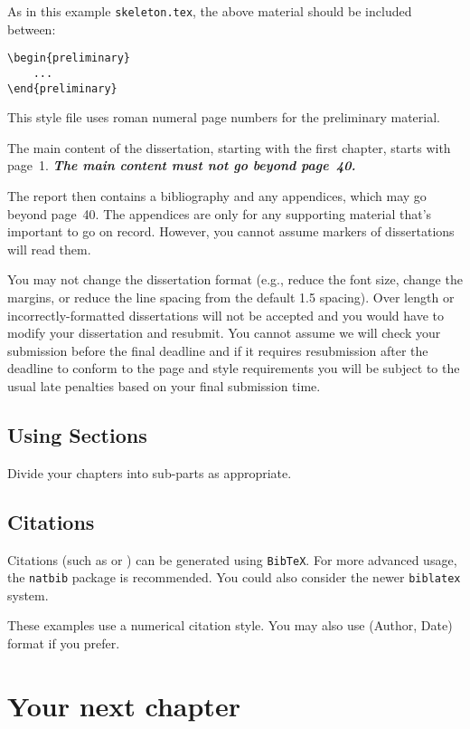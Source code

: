 \documentclass[msc,deptreport,dsti]{infthesis} %
\begin{document}
As in this example \texttt{skeleton.tex}, the above material should be
included between:
\begin{verbatim}
\begin{preliminary}
    ...
\end{preliminary}
\end{verbatim}
This style file uses roman numeral page numbers for the preliminary material.

The main content of the dissertation, starting with the first chapter,
starts with page~1. \emph{\textbf{The main content must not go beyond page~40.}}

The report then contains a bibliography and any appendices, which may go beyond
page~40. The appendices are only for any supporting material that's important to
go on record. However, you cannot assume markers of dissertations will read them.

You may not change the dissertation format (e.g., reduce the font
size, change the margins, or reduce the line spacing from the default
1.5 spacing). Over length or incorrectly-formatted dissertations will
not be accepted and you would have to modify your dissertation and
resubmit.  You cannot assume we will check your submission before the
final deadline and if it requires resubmission after the deadline to
conform to the page and style requirements you will be subject to the
usual late penalties based on your final submission time.

\section{Using Sections}

Divide your chapters into sub-parts as appropriate.

\section{Citations}

Citations (such as \cite{P1} or \cite{P2}) can be generated using
\texttt{BibTeX}. For more advanced usage, the \texttt{natbib} package is
recommended. You could also consider the newer \texttt{biblatex} system.

These examples use a numerical citation style. You may also use
(Author, Date) format if you prefer.

\chapter{Your next chapter}
\end{document}
